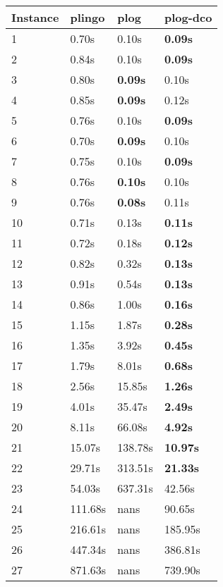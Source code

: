\begin{tabular}{|l|l|l|l|}
\toprule
\textbf{Instance} & \textbf{plingo} &  \textbf{plog} & \textbf{plog-dco} \\
\midrule
                1 &           0.70s &          0.10s &    \textbf{0.09s} \\
                2 &           0.84s &          0.10s &    \textbf{0.09s} \\
                3 &           0.80s & \textbf{0.09s} &             0.10s \\
                4 &           0.85s & \textbf{0.09s} &             0.12s \\
                5 &           0.76s &          0.10s &    \textbf{0.09s} \\
                6 &           0.70s & \textbf{0.09s} &             0.10s \\
                7 &           0.75s &          0.10s &    \textbf{0.09s} \\
                8 &           0.76s & \textbf{0.10s} &             0.10s \\
                9 &           0.76s & \textbf{0.08s} &             0.11s \\
               10 &           0.71s &          0.13s &    \textbf{0.11s} \\
               11 &           0.72s &          0.18s &    \textbf{0.12s} \\
               12 &           0.82s &          0.32s &    \textbf{0.13s} \\
               13 &           0.91s &          0.54s &    \textbf{0.13s} \\
               14 &           0.86s &          1.00s &    \textbf{0.16s} \\
               15 &           1.15s &          1.87s &    \textbf{0.28s} \\
               16 &           1.35s &          3.92s &    \textbf{0.45s} \\
               17 &           1.79s &          8.01s &    \textbf{0.68s} \\
               18 &           2.56s &         15.85s &    \textbf{1.26s} \\
               19 &           4.01s &         35.47s &    \textbf{2.49s} \\
               20 &           8.11s &         66.08s &    \textbf{4.92s} \\
               21 &          15.07s &        138.78s &   \textbf{10.97s} \\
               22 &          29.71s &        313.51s &   \textbf{21.33s} \\
               23 &          54.03s &        637.31s &            42.56s \\
               24 &         111.68s &           nans &            90.65s \\
               25 &         216.61s &           nans &           185.95s \\
               26 &         447.34s &           nans &           386.81s \\
               27 &         871.63s &           nans &           739.90s \\
\bottomrule
\end{tabular}
